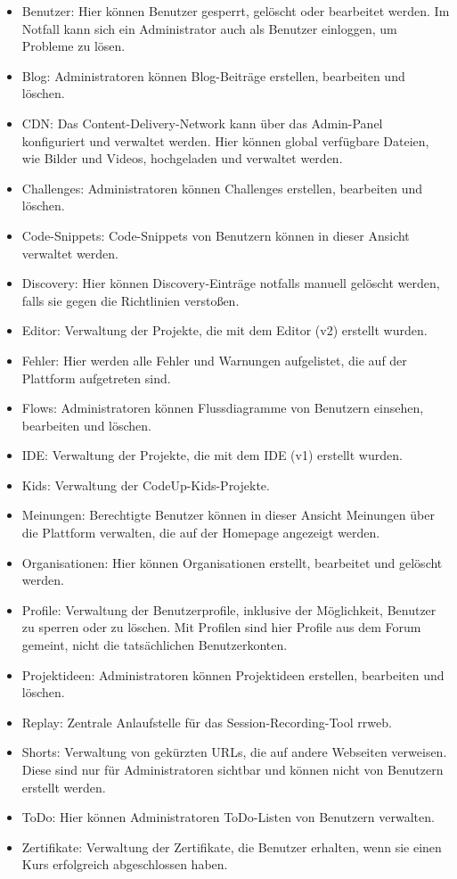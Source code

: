 \documentclass[main.tex]{subfiles}
\begin{document}
    \begin{itemize}
        \item Benutzer: Hier können Benutzer gesperrt, gelöscht oder bearbeitet werden.
        Im Notfall kann sich ein Administrator auch als Benutzer einloggen, um Probleme zu lösen.
        \item Blog: Administratoren können Blog-Beiträge erstellen, bearbeiten und löschen.
        \item CDN: Das Content-Delivery-Network kann über das Admin-Panel konfiguriert und verwaltet werden.
        Hier können global verfügbare Dateien, wie Bilder und Videos, hochgeladen und verwaltet werden.
        \item Challenges: Administratoren können Challenges erstellen, bearbeiten und löschen.
        \item Code-Snippets: Code-Snippets von Benutzern können in dieser Ansicht verwaltet werden.
        \item Discovery: Hier können Discovery-Einträge notfalls manuell gelöscht werden, falls sie gegen die Richtlinien verstoßen.
        \item Editor: Verwaltung der Projekte, die mit dem Editor (v2) erstellt wurden.
        \item Fehler: Hier werden alle Fehler und Warnungen aufgelistet, die auf der Plattform aufgetreten sind.
        \item Flows: Administratoren können Flussdiagramme von Benutzern einsehen, bearbeiten und löschen.
        \item IDE: Verwaltung der Projekte, die mit dem IDE (v1) erstellt wurden.
        \item Kids: Verwaltung der CodeUp-Kids-Projekte.
        \item Meinungen: Berechtigte Benutzer können in dieser Ansicht Meinungen über die Plattform verwalten, die auf der Homepage angezeigt werden.
        \item Organisationen: Hier können Organisationen erstellt, bearbeitet und gelöscht werden.
        \item Profile: Verwaltung der Benutzerprofile, inklusive der Möglichkeit, Benutzer zu sperren oder zu löschen.
        Mit Profilen sind hier Profile aus dem Forum gemeint, nicht die tatsächlichen Benutzerkonten.
        \item Projektideen: Administratoren können Projektideen erstellen, bearbeiten und löschen.
        \item Replay: Zentrale Anlaufstelle für das Session-Recording-Tool rrweb.
        \item Shorts: Verwaltung von gekürzten URLs, die auf andere Webseiten verweisen.
        Diese sind nur für Administratoren sichtbar und können nicht von Benutzern erstellt werden.
        \item ToDo: Hier können Administratoren ToDo-Listen von Benutzern verwalten.
        \item Zertifikate: Verwaltung der Zertifikate, die Benutzer erhalten, wenn sie einen Kurs erfolgreich abgeschlossen haben.
    \end{itemize}
\end{document}
